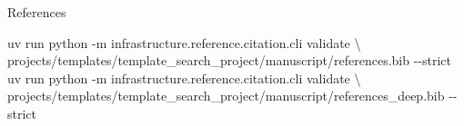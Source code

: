 \documentclass[
  ignorenonframetext,
]{beamer}
\newenvironment{Shaded}{}{}
\newcommand{\AttributeTok}[1]{\textcolor[rgb]{0.49,0.56,0.16}{#1}}
\newcommand{\DataTypeTok}[1]{\textcolor[rgb]{0.56,0.13,0.00}{#1}}
\newcommand{\ExtensionTok}[1]{#1}
\newcommand{\NormalTok}[1]{#1}
\begin{document}
\begin{frame}{References}
\begin{Shaded}
\begin{Highlighting}[]
\ExtensionTok{uv}\NormalTok{ run python }\AttributeTok{{-}m}\NormalTok{ infrastructure.reference.citation.cli validate }\DataTypeTok{\textbackslash{}}
\NormalTok{    projects/templates/template\_search\_project/manuscript/references.bib }\AttributeTok{{-}{-}strict}
\ExtensionTok{uv}\NormalTok{ run python }\AttributeTok{{-}m}\NormalTok{ infrastructure.reference.citation.cli validate }\DataTypeTok{\textbackslash{}}
\NormalTok{    projects/templates/template\_search\_project/manuscript/references\_deep.bib }\AttributeTok{{-}{-}strict}
\end{Highlighting}
\end{Shaded}
\end{frame}
\end{document}
